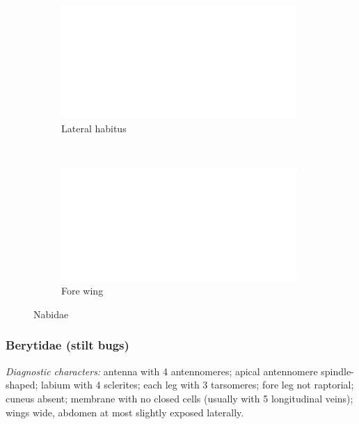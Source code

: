 \documentclass[letterpaper, 11pt]{article}
\begin{document}
\begin{figure}[ht!]
 \centering
 \begin{subfigure}[ht!]{0.4\textwidth}
  \includegraphics[width=\textwidth]{image14}
  \caption{Lateral habitus}
  \label{fig:nabid1}
 \end{subfigure}
 ~ %
 \begin{subfigure}[ht!]{0.5\textwidth}
  \includegraphics[width=\textwidth]{image14}
  \caption{Fore wing}
  \label{fig:nabidwing}
 \end{subfigure}
 \caption{Nabidae}\label{fig:nabidae}
\end{figure}

\subsubsection{Berytidae (stilt bugs)}
\noindent{}\textit{Diagnostic characters:} antenna with 4 antennomeres; apical antennomere spindle-shaped; labium with 4 sclerites; each leg with 3 tarsomeres; fore leg not raptorial; cuneus absent; membrane with no closed cells (usually with 5 longitudinal veins); wings wide, abdomen at most slightly exposed laterally.\\
\end{document}
